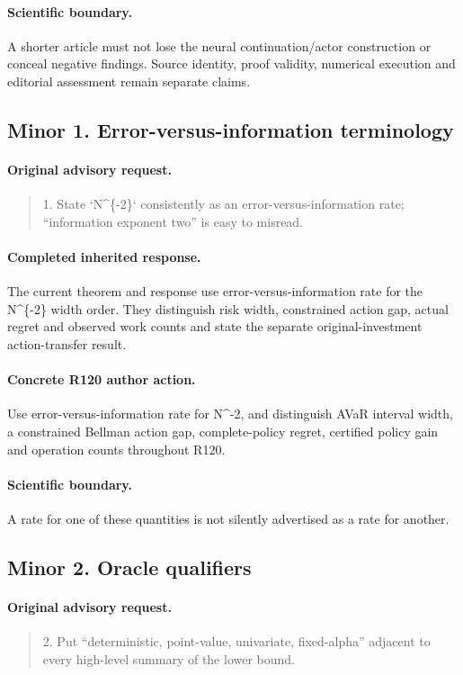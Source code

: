 \paragraph{Scientific boundary.}
A shorter article must not lose the neural continuation/actor construction or conceal negative findings. Source identity, proof validity, numerical execution and editorial assessment remain separate claims.

\subsection{Minor 1. Error-versus-information terminology}
\label{response120:minor-1}
\paragraph{Original advisory request.}
\begin{quote}
1. State `N\textasciicircum{}\{-2\}` consistently as an error-versus-information rate; “information exponent two” is easy to misread.
\end{quote}
\paragraph{Completed inherited response.}
The current theorem and response use error-versus-information rate for the N\textasciicircum{}\{-2\} width order. They distinguish risk width, constrained action gap, actual regret and observed work counts and state the separate original-investment action-transfer result.
\paragraph{Concrete R120 author action.}
Use error-versus-information rate for N\textasciicircum{}-2, and distinguish AVaR interval width, a constrained Bellman action gap, complete-policy regret, certified policy gain and operation counts throughout R120.
\paragraph{Scientific boundary.}
A rate for one of these quantities is not silently advertised as a rate for another.

\subsection{Minor 2. Oracle qualifiers}
\label{response120:minor-2}
\paragraph{Original advisory request.}
\begin{quote}
2. Put “deterministic, point-value, univariate, fixed-alpha” adjacent to every high-level summary of the lower bound.
\end{quote}
